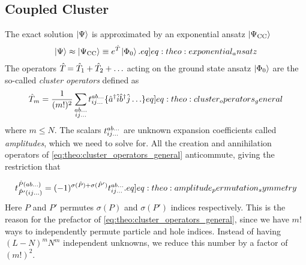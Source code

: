 \subsection{Coupled Cluster}
The exact solution $\ket{\Psi}$ is approximated by an exponential ansatz $\ket{\Psi_{\text{CC}}}$ 
\begin{align}
    \ket{\Psi} \approx \ketCC \equiv \exp{\cluster{}} \ketansatz. \label[eq]{eq:theo:exponential_ansatz}
\end{align}
The operators $\hat{T}_{} = \hat{T}_{1} + \hat{T}_{2} + \ldots$ acting on the ground state ansatz $\ket{\Phi_0}$ are the so-called \textit{cluster operators} defined as
\begin{align}
    \cluster{m} = \frac{1}{(m!)^2} \sum_{\substack{ab\ldots\\ij\ldots}} \amplitude{ab\ldots}{ij\ldots} \set{\crt{a}\ani{i} \crt{b} \ani{j}\ldots} \label[eq]{eq:theo:cluster_operators_general}
\end{align}
where $m \leq N$. The scalars $t^{ab\ldots}_{ij\ldots}$ are unknown expansion coefficients called \textit{amplitudes}, which we need to solve for. All the creation and annihilation operators of \cref{eq:theo:cluster_operators_general} anticommute, giving the restriction that

\begin{align}
    \amplitude{\hat{P}(ab\ldots)}{\hat{P}'(ij\ldots)} = (-1)^{\sigma(\hat{P})+\sigma(\hat{P}')} \amplitude{ab\ldots}{ij\ldots}. \label[eq]{eq:theo:amplitude_permutation_symmetry}
\end{align}
Here $P$ and $P'$ permutes $\sigma(P)$ and $\sigma(P')$ indices respectively. This is the reason for the prefactor of \cref{eq:theo:cluster_operators_general}, since we have $m!$ ways to independently permute particle and hole indices. Instead of having $(L-N)^m N^m$ independent unknowns, we reduce this number by a factor of $(m!)^{2}$. 

